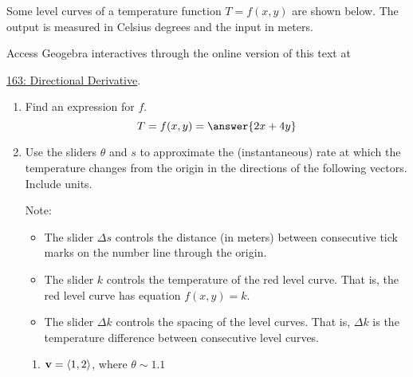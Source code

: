 \documentclass{ximera}
\begin{document}
\begin{question}  \label{Ee53hhy}

Some level curves of a temperature function $T = f(x,y)$ are shown below. The output is measured in Celsius degrees and the input in meters.

 
\begin{onlineOnly}
    \begin{center}
\end{center}
\end{onlineOnly}

Access Geogebra interactives through the online version of this text at
 
\href{https://www.geogebra.org/classic/htee9xke}{163: Directional Derivative}.


\begin{enumerate}
\item Find an expression for $f$.
\[
     T = f(x,y) = \answer{2x + 4y}
\]

\item Use the sliders $\theta$ and $s$ to approximate the (instantaneous) rate at which the temperature changes from the origin in the directions of the following vectors. Include units.

Note:

\begin{itemize}

\item The slider $\Delta s$ controls the distance (in meters) between consecutive tick marks on the number line through the origin. 

\item The slider $k$ controls the temperature of the red level curve. That is, the red level curve has equation $f(x,y)=k$.

\item The slider $\Delta k$ controls the spacing of the level curves. That is, $\Delta k$ is the temperature difference between consecutive level curves.  

\end{itemize}

\begin{enumerate}

\item ${\bf v} = \langle 1 ,2 \rangle$, where $\theta \sim 1.1$


\end{enumerate}
\end{enumerate}
\end{question}
\end{document}
